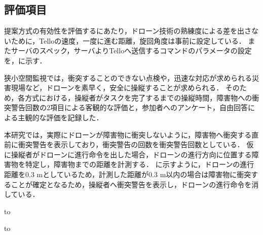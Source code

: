 \documentclass[submit, sigrecommended]{ipsj}
\begin{document}
\subsection{評価項目}
提案方式の有効性を評価するにあたり，ドローン技術の熟練度による差を出さないために，Telloの速度，一度に進む距離，旋回角度は事前に設定している．
またサーバのスペック，サーバよりTelloへ送信するコマンドのパラメータの設定を，に示す．
\par
狭小空間監視では，衝突することのできない点検や，迅速な対応が求められる災害現場など，ドローンを素早く，安全に操縦することが求められる．
そのため，各方式における，操縦者がタスクを完了するまでの操縦時間，障害物への衝突警告回数の2項目による客観的な評価と，参加者へのアンケート，自由回答による主観的な評価を記録した．
\par
本研究では，実際にドローンが障害物に衝突しないように，障害物へ衝突する直前に衝突警告を表示しており，衝突警告の回数を衝突警告回数としている．
仮に操縦者がドローンに進行命令を出した場合，ドローンの進行方向に位置する障害物を特定し，障害物までの距離を計測する．
に示すように，ドローンの進行距離を0.3 mとしているため，計測した距離が0.3 m以内の場合は障害物に衝突することが確定となるため，操縦者へ衝突警告を表示し，ドローンの進行命令を消している．


\begin{table}[tb] 
  \caption{サーバの性能} 
  \label{tab:server_spec}
  \hbox to
\end{table}


\begin{table}[tb] 
  \caption{ドローンへ送信するコマンドのパラメータ} 
  \label{tab:command_parameter}
  \hbox to
\end{table}
\end{document}

